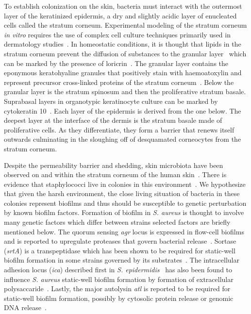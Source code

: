 \documentclass[10pt,letterpaper]{article}
\begin{document}
To establish colonization on the skin, bacteria must interact with the outermost layer of the keratinized epidermis, a dry and slightly acidic layer of enucleated cells called the stratum corneum.
Experimental modeling of the stratum corneum \textit{in vitro} requires the use of complex cell culture techniques primarily used in dermatology studies~\cite{nolte_development_1993}.
In homeostatic conditions, it is thought that lipids in the stratum corneum prevent the diffusion of substances to the granular layer~\cite{elias_epidermal_1983} which can be marked by the presence of loricrin~\cite{hohl_expression_1993}.
The granular layer contains the eponymous keratohyaline granules that positively stain with haemoatoxylin and represent precursor cross-linked proteins of the stratum corneum~\cite{matoltsy_desmosomes_1975}.
Below the granular layer is the stratum spinosum and then the proliferative stratum basale.
Suprabasal layers in organotypic keratinocyte culture can be marked by cytokeratin 10~\cite{stark_organotypic_1999}.
Each layer of the epidermis is derived from the one below.
The deepest layer at the interface of the dermis is the stratum basale made of proliferative cells.
As they differentiate, they form a barrier that renews itself outwards culminating in the sloughing off of desquamated corneocytes from the stratum corneum.

Despite the permeability barrier and shedding, skin microbiota have been observed on and within the stratum corneum of the human skin~\cite{malcolm_demonstration_1980}.
There is evidence that staphylococci live in colonies in this environment~\cite{ten_broeke-smits_hair_2010, nakatsuji_microbiome_2013}.
We hypothesize that given the harsh environment, the close living situation of bacteria in these colonies represent biofilms and thus should be susceptible to genetic perturbation by known biofilm factors.
Formation of biofilm in \textit{S. aureus} is thought to involve many genetic factors which differ between strains selected factors are briefly mentioned below.
The quorum sensing \textit{agr} locus is expressed in flow-cell biofilms and is reported to upregulate proteases that govern bacterial release~\cite{periasamy_how_2012, boles_agr-mediated_2008, yarwood_quorum_2004}.
Sortase (\textit{srtA}) is a transpeptidase which has been shown to be required for static-well biofilm formation in some strains governed by its substrates~\cite{oneill_novel_2008}.
The intracellular adhesion locus (\textit{ica}) described first in \textit{S. epidermidis}~\cite{mack_intercellular_1996} has also been found to influence \textit{S. aureus} static-well biofilm formation by formation of extracellular polysaccaride~\cite{cramton_intercellular_1999}.
Lastly, the major autolysin \textit{atl} is reported to be required for static-well biofilm formation, possibly by cytosolic protein release or genomic DNA release~\cite{bose_contribution_2012,foulston_extracellular_2014,ranjit_staphylococcus_2011}.
\end{document}
